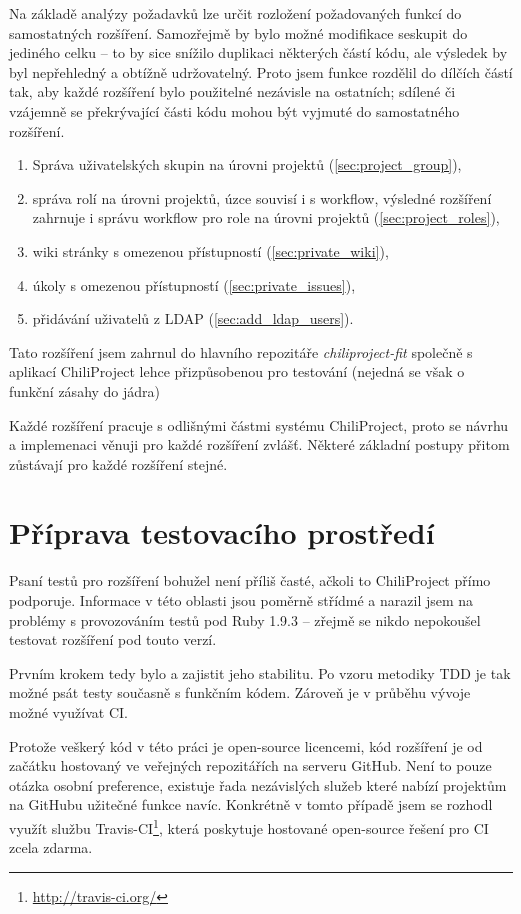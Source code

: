 \documentclass[thesis=B,czech]{FITthesis}[2012/05/02]
\begin{document}
Na základě analýzy požadavků lze určit rozložení požadovaných
funkcí do samostatných rozšíření. Samozřejmě by bylo možné modifikace
seskupit do jediného celku -- to by sice snížilo duplikaci některých částí kódu,
ale výsledek by byl nepřehledný a obtížně udržovatelný. Proto jsem funkce
rozdělil do dílčích částí tak, aby každé rozšíření bylo použitelné
nezávisle na ostatních; sdílené či vzájemně se překrývající části kódu
mohou být vyjmuté do samostatného rozšíření.

\begin{enumerate}
\item Správa uživatelských skupin na úrovni projektů (\ref{sec:project_group}),
\item správa rolí na úrovni projektů, úzce souvisí i s \gls{workflow}, výsledné rozšíření zahrnuje i
správu workflow pro role na úrovni projektů (\ref{sec:project_roles}),
\item wiki stránky s omezenou přístupností (\ref{sec:private_wiki}),
\item úkoly s omezenou přístupností (\ref{sec:private_issues}),
\item přidávání uživatelů z \gls{LDAP} (\ref{sec:add_ldap_users}).
\end{enumerate}

Tato rozšíření jsem zahrnul do hlavního repozitáře
\emph{chiliproject-fit} společně s aplikací ChiliProject lehce
přizpůsobenou pro testování (nejedná se však o funkční zásahy do jádra)

Každé rozšíření pracuje s odlišnými částmi systému ChiliProject, proto
se návrhu a implemenaci věnuji pro každé rozšíření zvlášť. Některé
základní postupy přitom zůstávají pro každé rozšíření stejné.

\section{Příprava testovacího prostředí}

Psaní testů pro rozšíření bohužel není příliš časté, ačkoli to
ChiliProject přímo podporuje. Informace v této oblasti jsou poměrně
střídmé a narazil jsem na problémy s provozováním testů pod Ruby 1.9.3
-- zřejmě se nikdo nepokoušel testovat rozšíření pod touto verzí.

Prvním krokem tedy bylo  a zajistit
jeho stabilitu. Po vzoru metodiky \gls{TDD} je tak možné psát testy
současně s funkčním kódem. Zároveň je v průběhu vývoje možné využívat
\gls{CI}.

Protože veškerý kód v této práci je open-source licencemi, kód rozšíření
je od začátku hostovaný ve veřejných repozitářích na serveru GitHub.
Není to pouze otázka osobní preference, existuje řada nezávislých služeb
které nabízí projektům na GitHubu užitečné funkce navíc. Konkrétně
v tomto případě jsem se rozhodl využít službu Travis-CI\footnote{\url{http://travis-ci.org/}},
která poskytuje hostované open-source řešení pro \gls{CI} zcela zdarma.
\end{document}
